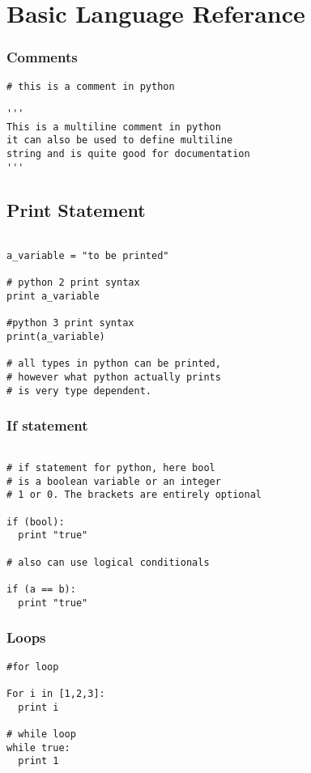 \documentclass[11pt,a4paper]{article}
\begin{document}
\appendix

\section{Basic Language Referance}

\subsubsection{Comments}
\begin{verbatim}
# this is a comment in python

'''
This is a multiline comment in python
it can also be used to define multiline
string and is quite good for documentation
'''

\end{verbatim}

\subsection{Print Statement}
\begin{verbatim}

a_variable = "to be printed"

# python 2 print syntax
print a_variable

#python 3 print syntax
print(a_variable)

# all types in python can be printed,
# however what python actually prints
# is very type dependent.

\end{verbatim}

\subsubsection{If statement}
\begin{verbatim}

# if statement for python, here bool
# is a boolean variable or an integer
# 1 or 0. The brackets are entirely optional

if (bool):
  print "true"

# also can use logical conditionals

if (a == b):
  print "true"

\end{verbatim}


\subsubsection{Loops}
\begin{verbatim}
#for loop

For i in [1,2,3]:
  print i 

# while loop
while true:
  print 1
\end{verbatim}
\end{document}
